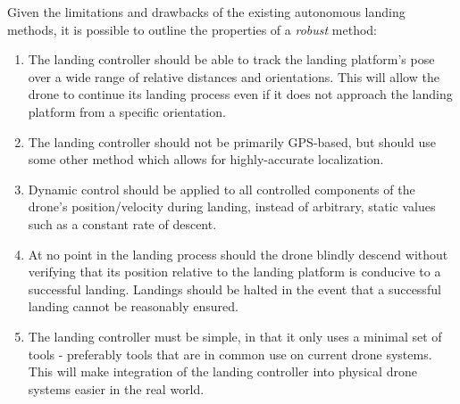 
Given the limitations and drawbacks of the existing autonomous landing methods, it is possible to outline the properties of a \textit{robust} method: 
\begin{enumerate}
    \item The landing controller should be able to track the landing platform's pose over a wide range of relative distances and orientations. This will allow the drone to continue its landing process even if it does not approach the landing platform from a specific orientation.
    \item The landing controller should not be primarily \gls{GPS}-based, but should use some other method which allows for highly-accurate localization.
    \item Dynamic control should be applied to all controlled components of the drone's position/velocity during landing, instead of arbitrary, static values such as a constant rate of descent.
    \item At no point in the landing process should the drone blindly descend without verifying that its position relative to the landing platform is conducive to a successful landing. Landings should be halted in the event that a successful landing cannot be reasonably ensured.
    \item The landing controller must be simple, in that it only uses a minimal set of tools - preferably tools that are in common use on current drone systems. This will make integration of the landing controller into physical drone systems easier in the real world.
\end{enumerate}

